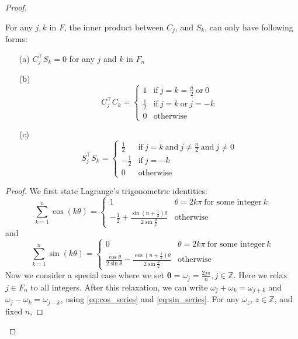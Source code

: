 \begin{proof}
\begin{lem}
\label{lemma:orthogonal-cos-sin}
For any $j, k$ in $F$, the inner product between $C_j$, and $S_k$, can only have following forms:
\begin{enumerate}
\item[(a)] $C^{\top}_j S_k = 0$ for any $j$ and $k$ in $F_n$ 
\item[(b)] 
\begin{equation}
C_j^\top C_k = 
\begin{cases}
1 & \text{if}~ j=k=\frac{n}{2} ~\text{or}~ 0 \\
\frac{1}{2} & \text{if}~ j=k ~\text{or}~ j=-k\\
0 & \text{otherwise}
\end{cases}
\end{equation}
\item[(c)] \begin{equation}
S_j^\top S_k = 
\begin{cases}
\frac{1}{2} & \text{if}~ j=k ~\text{and}~ j\neq \frac{n}{2}  ~\text{and}~ j\neq 0 \\
-\frac{1}{2} & \text{if}~ j=-k\\
0 & \text{otherwise}
\end{cases}
\end{equation} 
\end{enumerate}
\begin{proof}
We first state Lagrange's trigonometric identities: 
\begin{equation}
\label{eq:cos_series}
\sum_{k=1}^n \cos(k\theta) = 
\begin{cases}
1 & \theta = 2k\pi ~\text{for some integer}~ k \\
-\frac{1}{2}+\frac{\sin\left(n+\frac{1}{2}\right)\theta}{2\sin \frac{\theta}{2}}  & \text{otherwise}
\end{cases}
\end{equation}
and 
\begin{equation}
\label{eq:sin_series}
\sum_{k=1}^n \sin(k\theta) =
\begin{cases}
0 & \theta = 2k\pi ~\text{for some integer}~ k \\ 
\frac{\cos \theta}{2\sin \theta}-\frac{\cos\left(n+\frac{1}{2}\right)\theta}{2\sin \frac{\theta}{2}} & \text{otherwise}
\end{cases}
\end{equation}
Now we consider a special case where we set $\mathbf{\theta} = \omega_j = \frac{2j\pi}{n}, j\in \mathbb{Z}$. Here we relax $j\in F_n$ to all integers. After this relaxation, we can write $\omega_j+\omega_k = \omega_{j+k}$ and $\omega_j-\omega_k = \omega_{j-k}$, using \eqref{eq:cos_series} and \eqref{eq:sin_series}.
For any $\omega_z$, $z\in \mathbb{Z}$, and fixed $n$, 


\end{proof}
\end{lem}
\end{proof}
